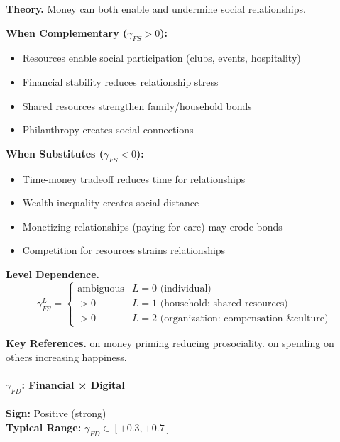 \textbf{Theory.}
Money can both enable and undermine social relationships.

\textbf{When Complementary ($\gamma_{FS} > 0$):}
\begin{itemize}
    \item Resources enable social participation (clubs, events, hospitality)
    \item Financial stability reduces relationship stress
    \item Shared resources strengthen family/household bonds
    \item Philanthropy creates social connections
\end{itemize}

\textbf{When Substitutes ($\gamma_{FS} < 0$):}
\begin{itemize}
    \item Time-money tradeoff reduces time for relationships
    \item Wealth inequality creates social distance
    \item Monetizing relationships (paying for care) may erode bonds
    \item Competition for resources strains relationships
\end{itemize}

\textbf{Level Dependence.}
\begin{equation}
\gamma^L_{FS} = \begin{cases}
    \text{ambiguous} & L = 0 \text{ (individual)} \\
    > 0 & L = 1 \text{ (household: shared resources)} \\
    > 0 & L = 2 \text{ (organization: compensation \& culture)}
\end{cases}
\end{equation}

\textbf{Key References.}
\citet{vohs2006psychological} on money priming reducing prosociality.
\citet{aknin2013prosocial} on spending on others increasing happiness.


\paragraph{$\gamma_{FD}$: Financial × Digital}

\begin{tcolorbox}[colback=green!5, colframe=green!50!black]
\textbf{Sign:} Positive (strong) \\
\textbf{Typical Range:} $\gamma_{FD} \in [+0.3, +0.7]$
\end{tcolorbox}

